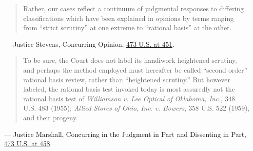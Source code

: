 \documentclass[12pt]{article}
\begin{document}
\begin{quote}
Rather, our cases reflect a continuum of judgmental responses to differing classifications which have been explained in opinions by terms ranging from ``strict scrutiny'' at one extreme to ``rational basis'' at the other.
\end{quote}
\noindent --- Justice Stevens, Concurring Opinion, \href{https://supreme.justia.com/cases/federal/us/473/432/}{473 U.S. at 451}.

\begin{quote}
To be sure, the Court does not label its handiwork heightened scrutiny, and perhaps the method employed must hereafter be called ``second order'' rational basis review, rather than ``heightened scrutiny.'' But however labeled, the rational basis test invoked today is most assuredly not the rational basis test of \textit{Williamson v. Lee Optical of Oklahoma, Inc.}, 348 U.S. 483 (1955); \textit{Allied Stores of Ohio, Inc. v. Bowers}, 358 U.S. 522 (1959), and their progeny.
\end{quote}
\noindent --- Justice Marshall, Concurring in the Judgment in Part and Dissenting in Part, \href{https://supreme.justia.com/cases/federal/us/473/432/}{473 U.S. at 458}.
\end{document}
